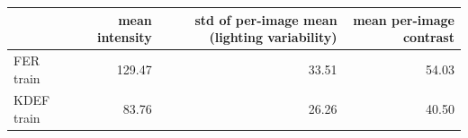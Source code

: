 \begin{tabular}{lrrr}
\toprule
 & mean intensity & std of per-image mean (lighting variability) & mean per-image contrast \\
\midrule
FER train & 129.47 & 33.51 & 54.03 \\
KDEF train & 83.76 & 26.26 & 40.50 \\
\bottomrule
\end{tabular}
